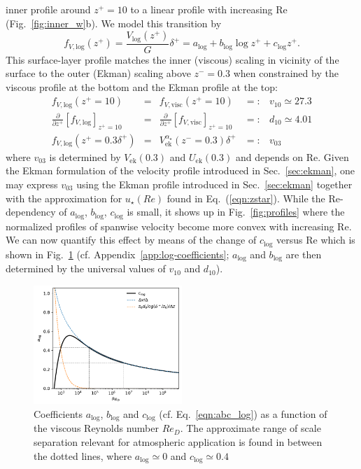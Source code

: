\documentclass[smallcondensed,final]{svjour3}
\newcommand{\p}{\partial}
\newcommand{\RE}{\mathrm{Re}}
\begin{document}
inner profile around $z^+=10$ to a linear profile with increasing $\RE$ (Fig.~\ref{fig:inner_w}b).
%
We model this transition by 
%
\begin{equation}
  f_{V,\mathrm{log}}(z^+) = \frac{V_\mathrm{log}(z^+)}{G} \delta^+ = a_\mathrm{log} + b_\mathrm{log} \log z^+ + c_\mathrm{log} z^+. 
  \label{eqn:abc_log}
\end{equation} 
%
This surface-layer profile matches the inner (viscous) scaling in vicinity of the surface to the outer
(Ekman) scaling above $z^-=0.3$ when constrained by the viscous profile at the bottom and the
Ekman profile at the top:
%
\begin{subequations} 
  \label{eqn:match}
\begin{align}
  f_{V,\mathrm{log}}(z^+=10) &=& f_{V,\mathrm{visc}}(z^+=10) &=:& v_{10} \simeq 27.3\\
  \frac{\p}{\p z^+} \left[ f_{V,\mathrm{log}}\right]_{z^+=10} &=& \frac{\p}{\p z^+}\left[ f_{V,\mathrm{visc}}\right]_{z^+=10} &=:&d_{10}\simeq 4.01 \\
  f_{V,\mathrm{log}}(z^+=0.3\delta^+) &=& V^{\alpha_\star}_\mathrm{ek}(z^-=0.3)\delta^+&=:& v_{03} 
\end{align}
\end{subequations}
where $v_{03}$ is determined by $V_\mathrm{ek}(0.3)$ and $U_\mathrm{ek}(0.3)$ and depends on $\RE$.
%
Given the Ekman formulation of the velocity profile introduced in Sec.~\ref{sec:ekman},
one may express $v_{03}$ using the Ekman profile introduced in Sec.~\ref{sec:ekman} together
with the approximation for $u_\star(Re)$ found in Eq.~(\ref{eqn:zstar}). 
% 
%
While the $\RE$-dependency of $a_\mathrm{log}$, $b_\mathrm{log}$, $c_\mathrm{log}$
is small, it shows up in Fig.~\ref{fig:profiles} where the normalized profiles
of spanwise velocity become more convex with increasing $\RE$.
%
We can now quantify this effect by means of the change of $c_\mathrm{log}$ versus $\RE$ which is shown in
Fig.~\ref{fig:clog} (cf. Appendix~\ref{app:log-coefficients};
$a_\mathrm{log}$ and $b_\mathrm{log}$ are then determined by the universal
values of $v_{10}$ and $d_{10}$).
%
%
\begin{figure}
  \centerline{\includegraphics[width=0.5\textwidth]{../plot/c_log.pdf}}
  \caption{Coefficients $a_\text{log}$, $b_\text{log}$ and $c_\text{log}$ 
    (cf. Eq.~\ref{eqn:abc_log}) 
    as a function of 
    the viscous Reynolds number $Re_D$. The approximate range of scale separation relevant for atmospheric application 
    is found in between the dotted lines, where $a_\text{log}\simeq 0$ and $c_\text{log}\simeq 0.4$ }
  \label{fig:clog}
\end{figure} 
%
\par
% 
\end{document}

